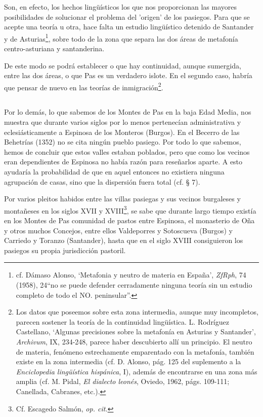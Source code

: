 Son, en efecto, los hechos lingüísticos los que nos proporcionan las mayores posibilidades de solucionar el problema del 'origen' de los pasiegos. Para que se acepte una teoría u otra, hace falta un estudio lingüístico detenido de Santander y de Asturias\footnote{cf. Dámaso Alonso, `Metafonia y neutro de materia en España', \emph{ZfRph}, 74 (1958), 24``no se puede defender cerradamente ninguna teoría sin un estudio completo de todo el NO. peninsular''.}, sobre todo de la zona que separa las dos áreas de metafonía centro-asturiana y santanderina.

De este modo se podrá establecer o que hay continuidad, aunque sumergida, entre las dos áreas, o que Pas es un verdadero islote. En el segundo caso, habría que pensar de nuevo en las teorías de inmigración\footnote{Los datos que poseemos sobre esta zona intermedia, aunque muy incompletos, parecen sostener la teoría de la continuidad lingüística. L. Rodríguez Castellano, `Algunas precisiones sobre la metafonía en Asturias y Santander', \emph{Archivum}, IX, 234-248, parece haber descubierto allí un principio. El neutro de materia, fenómeno estrechamente emparentado con la metafonía, también existe en la zona intermedia (cf. D. Alonso, pág. 125 del suplemento a la \emph{Enciclopedia lingüística hispánica}, I), además de encontrarse en una zona más amplia (cf. M. Pidal, \emph{El dialecto leonés}, Oviedo, 1962, págs. 109-111; Canellada, Cabranes, etc.).}.

\subsection{} Por lo demás, lo que sabemos de los Montes de Pas en la baja Edad Media, nos muestra que durante varios siglos por lo menos pertenecían administrativa y eclesiásticamente a Espinosa de los Monteros (Burgos). En el Becerro de las Behetrías (1352) no se cita ningún pueblo pasiego. Por todo lo que sabemos, hemos de concluir que estos valles estaban poblados, pero que como los vecinos eran dependientes de Espinosa no había razón para reseñarlos aparte. A esto ayudaría la probabilidad de que en aquel entonces no existiera ninguna agrupación de casas, sino que la dispersión fuera total (cf. § 7).

Por varios pleitos habidos entre las villas pasiegas y sus vecinos burgaleses y montañeses en los siglos XVII y XVIII\footnote{Cf. Escagedo Salmón, \emph{op. cit.}}, se sabe que durante largo tiempo existía en los Montes de Pas comunidad de pastos entre Espinosa, el monasterio de Oña y otros muchos Concejos, entre ellos Valdeporres y Sotoscueva (Burgos) y Carriedo y Toranzo (Santander), hasta que en el siglo XVIII consiguieron los pasiegos su propia jurisdicción pastoril.

